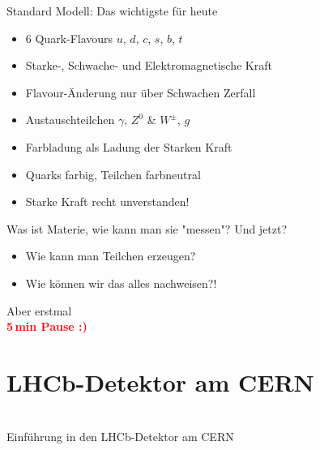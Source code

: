 \begin{frame}{Standard Modell: Das wichtigste für heute}
\begin{itemize} \Large
    \item[\ding{55}] 6 Quark-Flavours  $u$, $d$, $c$, $s$, $b$, $t$
    \item[\ding{55}] Starke-, Schwache- und Elektromagnetische Kraft
    \item[\ding{55}] Flavour-Änderung nur über Schwachen Zerfall
    \item[\ding{55}] Austauschteilchen $\gamma$, $Z^0$ \& $W^{\pm}$, $g$
    \item[\ding{55}] Farbladung als Ladung der Starken Kraft
    \item[\ding{55}] Quarks farbig, Teilchen farbneutral
    \item[\ding{62}] Starke Kraft recht unverstanden!
\end{itemize}
    
\end{frame}
  \begin{frame}{Was ist Materie, wie kann man sie "messen"?}\Large
 Und jetzt?
 \begin{itemize}
     \item Wie kann man Teilchen erzeugen?
     \item Wie können wir das alles nachweisen?!
 \end{itemize}
\begin{center} \pause
 
Aber erstmal \\   \textbf{\textcolor{red}{5\,min Pause :)}
}
\end{center}  
\end{frame}
   \section{LHCb-Detektor am CERN}
\begin{frame}[plain]

\begin{center} 
  \huge{   }\\
   \Large{ Einführung in den LHCb-Detektor am CERN}

\end{center}
\end{frame}


